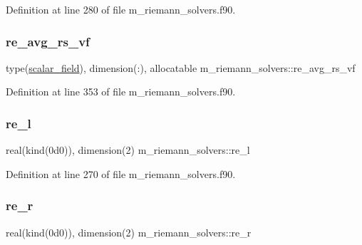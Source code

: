 Definition at line 280 of file m\+\_\+riemann\+\_\+solvers.\+f90.

\mbox{\label{namespacem__riemann__solvers_ada8ab10b02113187113eed8f49f1ed2d}} 
\subsubsection{\texorpdfstring{re\+\_\+avg\+\_\+rs\+\_\+vf}{re\_avg\_rs\_vf}}
{\footnotesize\ttfamily type(\hyperlink{structm__derived__types_1_1scalar__field}{scalar\+\_\+field}), dimension(\+:), allocatable m\+\_\+riemann\+\_\+solvers\+::re\+\_\+avg\+\_\+rs\+\_\+vf}



Definition at line 353 of file m\+\_\+riemann\+\_\+solvers.\+f90.

\mbox{\label{namespacem__riemann__solvers_a2a804f5759af46c82fdd62633b5e7605}} 
\subsubsection{\texorpdfstring{re\+\_\+l}{re\_l}}
{\footnotesize\ttfamily real(kind(0d0)), dimension(2) m\+\_\+riemann\+\_\+solvers\+::re\+\_\+l}



Definition at line 270 of file m\+\_\+riemann\+\_\+solvers.\+f90.

\mbox{\label{namespacem__riemann__solvers_a31045aff8e978fd620943eaed4fbb973}} 
\subsubsection{\texorpdfstring{re\+\_\+r}{re\_r}}
{\footnotesize\ttfamily real(kind(0d0)), dimension(2) m\+\_\+riemann\+\_\+solvers\+::re\+\_\+r}



